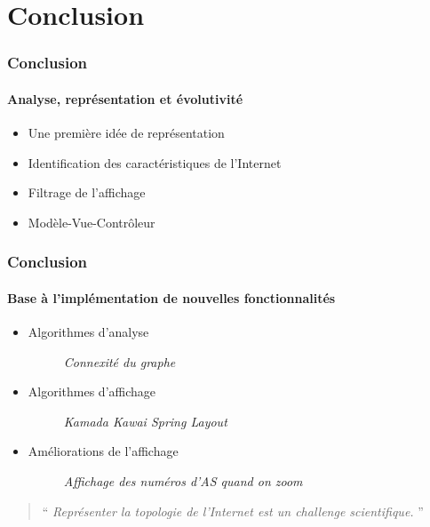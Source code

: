 \section*{Conclusion}

\frame
{
\frametitle{Conclusion}
\framesubtitle{Analyse, représentation et évolutivité}

 \begin{itemize}
 \item Une première idée de représentation
 \item Identification des caractéristiques de l'Internet
 \item Filtrage de l'affichage
 \item Modèle-Vue-Contrôleur
 \end{itemize}

 

}

\frame
{
\frametitle{Conclusion}
\framesubtitle{Base à l'implémentation de nouvelles fonctionnalités}

 \begin{itemize} 
 \item Algorithmes d'analyse
\begin{description}
 \item[] \small{\emph{Connexité du graphe}}
 \end{description}
 \item Algorithmes d'affichage
\begin{description}
 \item[] \small {\emph{ Kamada Kawai Spring Layout}}
 \end{description}

% 
 \item Améliorations de l'affichage 

\begin{description}
 \item[] \small{\emph{Affichage des numéros d'AS quand on zoom}}
 \end{description}
% 
 \end{itemize}
\vfill

\begin{verse}
 `` \textit{Représenter la topologie de l'Internet est un challenge scientifique. }''
\end{verse} 

}